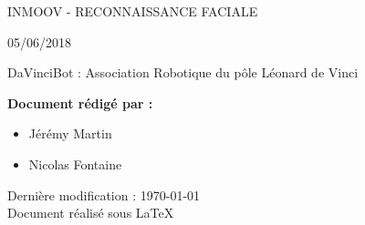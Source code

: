 \documentclass[12pt, oneside]{article}
\newcommand{\type}{05/06/2018}	%
\newcommand{\auteur}{\item Jérémy Martin
				      \item Nicolas Fontaine}	%
\newcommand{\titre}{InMoov - Reconnaissance faciale}
\begin{document}
\pagestyle{style}

\begin{center}
\begin{minipage}{0.75\linewidth}
\begin{center}
\centering
   
\vspace{3cm}
\colorbox{gristitle}{
\begin{minipage}{\textwidth}
    \begin{center}
    	\vspace{0.5cm}
    	{\color{bleu} \uppercase{\Huge {\titre}}}
    	\vspace{0.25cm}\linebreak
		\par \color{gris} {\Large \type}	
	\end{center}    
\end{minipage}    
}

\vspace{2.5cm}

\color{bleu} {\Large DaVinciBot \color{gris} : Association Robotique du pôle Léonard de Vinci  \par}
\end{center}

\vspace{1.5cm}
  
\color{gris} {\Large \textbf{Document rédigé par :}
\large
\begin{addmargin}[1em]{1em}
    \begin{itemize}[label= , noitemsep]
    	\auteur
    \end{itemize}
\end{addmargin}}
    
\vspace{2.5cm}
\begin{center}
    {\large Dernière modification : \today \\ Document réalisé sous \LaTeX }
\end{center}
\end{minipage}
\end{center}

\newpage


\end{document}
